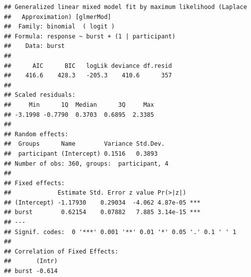 \documentclass[
]{article}
\begin{document}
\begin{verbatim}
## Generalized linear mixed model fit by maximum likelihood (Laplace
##   Approximation) [glmerMod]
##  Family: binomial  ( logit )
## Formula: response ~ burst + (1 | participant)
##    Data: burst
## 
##      AIC      BIC   logLik deviance df.resid 
##    416.6    428.3   -205.3    410.6      357 
## 
## Scaled residuals: 
##     Min      1Q  Median      3Q     Max 
## -3.1998 -0.7790  0.3703  0.6895  2.3385 
## 
## Random effects:
##  Groups      Name        Variance Std.Dev.
##  participant (Intercept) 0.1516   0.3893  
## Number of obs: 360, groups:  participant, 4
## 
## Fixed effects:
##             Estimate Std. Error z value Pr(>|z|)    
## (Intercept) -1.17930    0.29034  -4.062 4.87e-05 ***
## burst        0.62154    0.07882   7.885 3.14e-15 ***
## ---
## Signif. codes:  0 '***' 0.001 '**' 0.01 '*' 0.05 '.' 0.1 ' ' 1
## 
## Correlation of Fixed Effects:
##       (Intr)
## burst -0.614
\end{verbatim}
\end{document}
